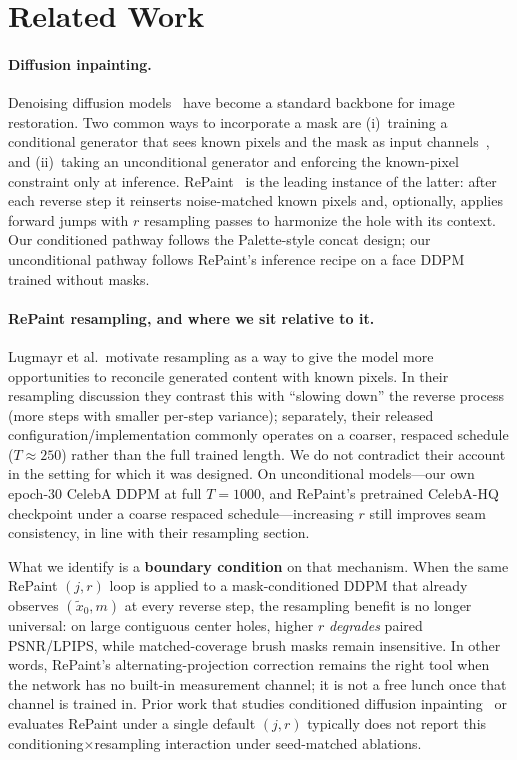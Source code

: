 \section{Related Work}
\label{sec:related}

\paragraph{Diffusion inpainting.}
Denoising diffusion models~\citep{ho2020ddpm} have become a standard backbone for image restoration.
Two common ways to incorporate a mask are (i)~training a conditional generator that sees known pixels and the mask as input channels~\citep{saharia2022palette}, and (ii)~taking an unconditional generator and enforcing the known-pixel constraint only at inference.
RePaint~\citep{lugmayr2022repaint} is the leading instance of the latter: after each reverse step it reinserts noise-matched known pixels and, optionally, applies forward jumps with $r$ resampling passes to harmonize the hole with its context.
Our conditioned pathway follows the Palette-style concat design; our unconditional pathway follows RePaint's inference recipe on a face DDPM trained without masks.

\paragraph{RePaint resampling, and where we sit relative to it.}
Lugmayr et al.\ motivate resampling as a way to give the model more opportunities to reconcile generated content with known pixels.
In their resampling discussion they contrast this with ``slowing down'' the reverse process (more steps with smaller per-step variance); separately, their released configuration/implementation commonly operates on a coarser, respaced schedule ($T{\approx}250$) rather than the full trained length.
We do not contradict their account in the setting for which it was designed.
On unconditional models---our own epoch-$30$ CelebA DDPM at full $T{=}1000$, and RePaint's pretrained CelebA-HQ checkpoint under a coarse respaced schedule---increasing $r$ still improves seam consistency, in line with their resampling section.

What we identify is a \textbf{boundary condition} on that mechanism.
When the same RePaint $(j,r)$ loop is applied to a mask-conditioned DDPM that already observes $(\tilde{x}_0,m)$ at every reverse step, the resampling benefit is no longer universal: on large contiguous center holes, higher $r$ \emph{degrades} paired PSNR/LPIPS, while matched-coverage brush masks remain insensitive.
In other words, RePaint's alternating-projection correction remains the right tool when the network has no built-in measurement channel; it is not a free lunch once that channel is trained in.
Prior work that studies conditioned diffusion inpainting~\citep{saharia2022palette} or evaluates RePaint under a single default $(j,r)$ typically does not report this conditioning$\times$resampling interaction under seed-matched ablations.

